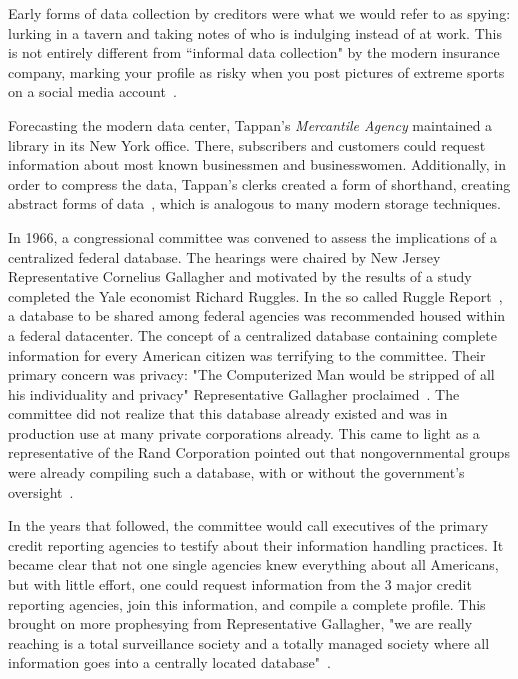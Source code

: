 Early forms of data collection by creditors were what we would refer to as
spying: lurking in a tavern and taking notes of who is indulging instead of at
work. This is not entirely different from ``informal data collection" by the
modern insurance company, marking your profile as risky when you post pictures
of extreme sports on a social media account~\cite{naic2012}.

Forecasting the modern data center, Tappan's \textit{Mercantile Agency}
maintained a library in its New York office. There, subscribers and customers
could request information about most known businessmen and businesswomen.
Additionally, in order to compress the data, Tappan's clerks created a form of
shorthand, creating abstract forms of data~\cite{lauer2017creditworthy}, which
is analogous to many modern storage techniques.

In 1966, a congressional committee was convened to assess the implications of a
centralized federal database. The hearings were chaired by New Jersey
Representative Cornelius Gallagher and motivated by the results of a study
completed the Yale economist Richard Ruggles. In the so called Ruggle
Report~\cite{ruggles1965report}, a database to be shared among federal agencies
was recommended housed within a federal datacenter. The concept of a
centralized database containing complete information for every American citizen
was terrifying to the committee. Their primary concern was privacy: "The
Computerized Man would be stripped of all his individuality and privacy"
Representative Gallagher proclaimed~\cite{ruggles1965report}. The committee did
not realize that this database already existed and was in production use at
many private corporations already. This came to light as a representative of
the Rand Corporation pointed out that nongovernmental groups were already
compiling such a database, with or without the government's
oversight~\cite{congress1967privacy}.

In the years that followed, the committee would call executives of the primary
credit reporting agencies to testify about their information handling
practices. It became clear that not one single agencies knew everything about
all Americans, but with little effort, one could request information from the 3
major credit reporting agencies, join this information, and compile a complete
profile. This brought on more prophesying from Representative Gallagher, "we
are really reaching is a total surveillance society and a totally managed
society where all information goes into a centrally located
database"~\cite{congress1967privacy}.
